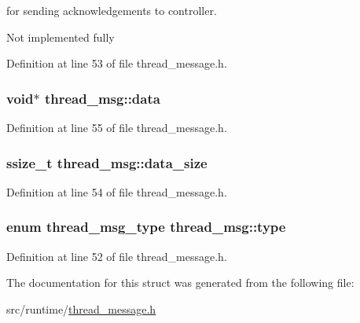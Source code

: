 for sending acknowledgements to controller. 

Not implemented fully 

Definition at line 53 of file thread\-\_\-message.\-h.

\hypertarget{structthread__msg_adbe60c1c6c0aca2e83f5e3e5bedb1b18}{
\subsubsection[{data}]{\setlength{\rightskip}{0pt plus 5cm}void$\ast$ thread\-\_\-msg\-::data}}\label{structthread__msg_adbe60c1c6c0aca2e83f5e3e5bedb1b18}


Definition at line 55 of file thread\-\_\-message.\-h.

\hypertarget{structthread__msg_a7f32cae0c8abf93abf07be5fb141530f}{
\subsubsection[{data\-\_\-size}]{\setlength{\rightskip}{0pt plus 5cm}ssize\-\_\-t thread\-\_\-msg\-::data\-\_\-size}}\label{structthread__msg_a7f32cae0c8abf93abf07be5fb141530f}


Definition at line 54 of file thread\-\_\-message.\-h.

\hypertarget{structthread__msg_a21b68a06c996049760fba8a1b148d215}{
\subsubsection[{type}]{\setlength{\rightskip}{0pt plus 5cm}enum {\bf thread\-\_\-msg\-\_\-type} thread\-\_\-msg\-::type}}\label{structthread__msg_a21b68a06c996049760fba8a1b148d215}


Definition at line 52 of file thread\-\_\-message.\-h.



The documentation for this struct was generated from the following file\-:\begin{DoxyCompactItemize}
\item 
src/runtime/\hyperlink{thread__message_8h}{thread\-\_\-message.\-h}\end{DoxyCompactItemize}
